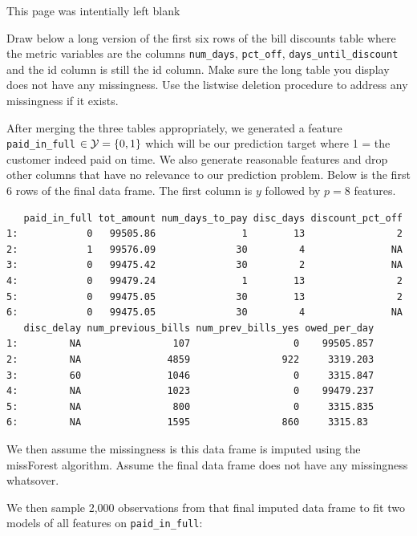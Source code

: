 \documentclass[12pt]{article}
\begin{document}
This page was intentially left blank
\pagebreak



 Draw below a long version of the first six rows of the bill discounts table where the metric variables are the columns \texttt{num\_days}, \texttt{pct\_off}, \texttt{days\_until\_discount} and the id column is still the id column. Make sure the long table you display does not have any missingness. Use the listwise deletion procedure to address any missingness if it exists. 


After merging the three tables appropriately, we generated a feature \texttt{paid\_in\_full} $\in \mathcal{Y} = \left\{0,1\right\}$ which will be our prediction target where 1 = the customer indeed paid on time. We also generate reasonable features and drop other columns that have no relevance to our prediction problem. Below is the first 6 rows of the final data frame. The first column is $y$ followed by $p=8$ features.


\begin{verbatim}
   paid_in_full tot_amount num_days_to_pay disc_days discount_pct_off
1:            0   99505.86               1        13                2
2:            1   99576.09              30         4               NA
3:            0   99475.42              30         2               NA
4:            0   99479.24               1        13                2
5:            0   99475.05              30        13                2
6:            0   99475.05              30         4               NA
   disc_delay num_previous_bills num_prev_bills_yes owed_per_day
1:         NA                107                  0    99505.857
2:         NA               4859                922     3319.203
3:         60               1046                  0     3315.847
4:         NA               1023                  0    99479.237
5:         NA                800                  0     3315.835
6:         NA               1595                860     3315.83
\end{verbatim}

We then assume the missingness is this data frame is imputed using the missForest algorithm. Assume the final data frame does not have any missingness whatsover.

We then sample 2,000 observations from that final imputed data frame to fit two models of all features on \texttt{paid\_in\_full}:
\end{document}
